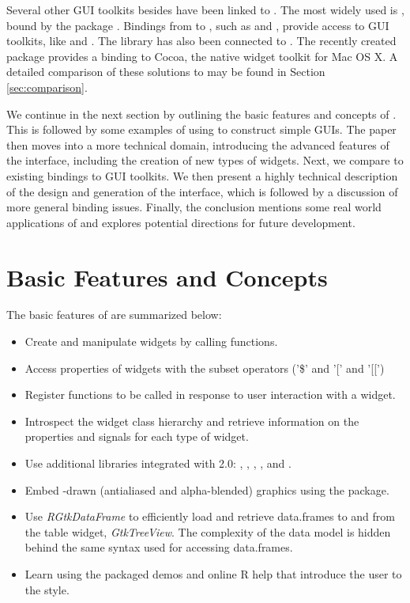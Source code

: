 \documentclass[article]{jss}
\begin{document}
Several other GUI toolkits besides  have been linked to . The
most widely used is  \citep{ousterhout,welch}, bound by the  
package \citep{Rnews:Dalgaard:2001a, Rnews:Dalgaard:2002}.
Bindings from  to , such as  \citep{rjava} 
and  \citep{sjava},
provide access to  GUI toolkits, like  and . The 
library \citep{wxwidgets} has also been connected to . The recently
created  package \citep{rcocoa} provides a binding to Cocoa,
the native widget toolkit for Mac OS X. A detailed comparison of these
solutions to  may be found in Section \ref{sec:comparison}.

We continue in the next section by outlining the basic features and 
concepts of . This is followed by some examples of using 
 to construct simple GUIs.  The paper then moves into a more technical
domain, introducing the advanced features of the 
interface, including the creation of new types of widgets. Next, we compare 
 to existing  bindings to GUI toolkits. We then present
a highly technical description of the design and generation of
the interface, which is followed by a discussion of more general binding issues.
Finally, the conclusion mentions some real world applications of 
 and explores potential directions for future development.

\section{Basic Features and Concepts}\label{sec:basic-features}

The basic features of  are summarized below:

\begin{itemize}
\item Create and manipulate  widgets by calling  functions.
\item Access properties of widgets with the  subset operators
('{\$}' and '{[}' and '{[}{[}')
\item Register  functions to be called in response to user 
interaction with a widget.
\item Introspect the widget class hierarchy and retrieve information on
the properties and signals for each type of widget.
\item Use additional libraries integrated with  2.0: , 
, , ,  and .
\item Embed -drawn (antialiased and alpha-blended) 
 graphics using the  package.
\item Use \emph{RGtkDataFrame} to efficiently load and retrieve data.frames
to and from the  table widget, \emph{GtkTreeView}. The complexity
of the data model is hidden behind the same syntax used for accessing data.frames.
\item Learn using the packaged demos and online R help that introduce the user to the
 style.
\end{itemize}
\end{document}
